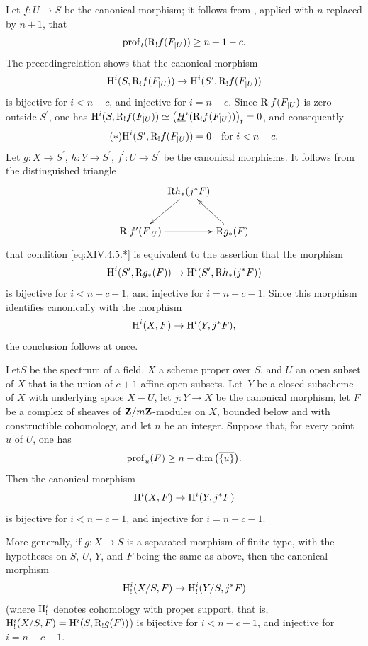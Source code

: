 Let $f\colon U\to S$ be the canonical morphism; it follows from
, applied with $n$ replaced by $n+1$, that
$$
\prof_{t}(\R_{!}f(F\sisi{|U}{_{|U}}))\geq n+1-c.
$$
The preceding\pageoriginale relation shows that the canonical morphism
$$
\H^{i}(S, \R_{!}f(F\sisi{|U}{_{|U}}))\to\H^{i}(S^{\prime}, \R_{!}f(F\sisi{|U}{_{|U}}))$$
is bijective for $i<n-c$, and injective for $i=n-c$. Since $\R_{!}f(F\sisi{|U}{_{|U}})$ is zero outside $S^{\prime}$, one has $\H^{i}(S, \R_{!}f(F\sisi{|U}{_{|U}}))\simeq\big(\underline{H}^{i}(\R_{!}f(F\sisi{|U}{_{|U}}))\big)_{t}=0$, and consequently
\begin{equation*} \label{eq:XIV.4.5.*} \tag{$*$}
\H^{i}(S^{\prime}, \R_{!}f(F\sisi{|U}{_{|U}}))=0\quad\text{for }i<n-c.
\end{equation*}
Let $g\colon X\to S^{\prime}$, $h\colon Y\to S^{\prime}$, $f^{\prime}\colon U\to S^{\prime}$ be the canonical morphisms. It follows from the distinguished triangle
$$
\xymatrix@C=0pt{ & \R h_{\ast}(j^{\ast}F)\ar[ld] & \\
\R_{!}f^{\prime}(F\sisi{|U}{_{|U}})\ar[rr] & & \R g_{\ast}(F)\ar[lu] }$$
that condition \eqref{eq:XIV.4.5.*} is equivalent to the assertion that the morphism
$$
\H^{i}(S^{\prime}, \R g_{\ast}(F))\to\H^{i}(S^{\prime}, \R h_{\ast}(j^{\ast}F))$$
is bijective for $i<n-c-1$, and injective for $i=n-c-1$. Since this morphism identifies canonically with the morphism
$$
\H^{i}(X, F)\to\H^{i}(Y, j^{\ast}F),
$$
the conclusion follows at once.

\begin{corollaire} \label{XIV.4.6}
Let\pageoriginale $S$ be the spectrum of a field, $X$ a scheme proper over $S$, and $U$ an open subset of $X$ that is the union of $c+1$ affine open subsets. Let~$Y$ be a closed subscheme of $X$ with underlying space $X-U$, let $j\colon Y\to X$ be the canonical morphism, let $F$ be a complex of sheaves of $\ZZ/m\ZZ$-modules on $X$, bounded below and with constructible cohomology, and let $n$ be an integer. Suppose that, for every point $u$ of $U$, one has
$$
\prof_{u}(F)\geq n-\dim\big(\overline{\{ u\} }\big).
$$
Then the canonical morphism
$$
\H^{i}(X, F)\to\H^{i}(Y, j^{\ast}F)$$
is bijective for $i<n-c-1$, and injective for $i=n-c-1$.

More generally, if $g\colon X\to S$ is a separated morphism of finite type, with the hypotheses on $S$, $U$, $Y$, and $F$ being the same as above, then the canonical morphism
$$
\H_{!}^{i}(X/S, F)\to\H_{!}^{i}(Y/S, j^{\ast}F)$$
(where $\H_{!}^{i}$ denotes cohomology with proper support, that is, $\H_{!}^{i}(X\sisi{}{/S}, F)=\H^{i}(S, \R_{!}g(F))$) is bijective for $i<n-c-1$, and injective for $i=n-c-1$.
\end{corollaire}

